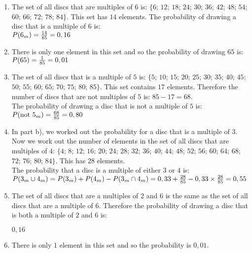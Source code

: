 \begin{solutions}{}
{\begin{enumerate}[itemsep=5pt, label=\textbf{\arabic*}. ]
\begin{enumerate}[noitemsep, label=\textbf{(\alph*)} ]
    \item The set of all discs that are multiples of $6$ is: $\{6$; $ 12$; $ 18$; $ 24$; $ 30$; $ 36$; $ 42$; $ 48$; $ 54$; $ 60$; $ 66$; $ 72$; $ 78$; $ 84\}$. This set has $14$ elements.
    The probability of drawing a disc that is a multiple of $6$ is:\\
    $P(6_m) = \frac{14}{85}\\
	    = 0,16$

    \item There is only one element in this set and so the probability of drawing $65$ is:\\
    $P(65) = \frac{1}{85}\\
	   = 0,01$

    \item The set of all discs that is a multiple of $5$ is: $\{5$; $ 10$; $ 15$; $ 20$; $ 25$; $ 30$; $ 35$; $ 40$; $ 45$; $ 50$; $ 55$; $ 60$; $ 65$; $ 70$; $ 75$; $ 80$; $ 85\}$. This set contains $17$ elements. Therefore the number of discs that are not multiples of $5$ is: $85 − 17 = 68$.\\
   
    The probability of drawing a disc that is not a multiple of $5$ is:\\
    $P(\mbox{not }5_m) = \frac{68}{85}\\
	       = 0,80$

    \item In part b), we worked out the probability for a disc that is a multiple of $3$. Now we work out the number of elements in the set of all discs that are multiples of $4$: $\{4$; $ 8$; $ 12$; $ 16$; $ 20$; $ 24$; $ 28$; $ 32$; $ 36$; $ 40$; $ 44$; $ 48$; $ 52$; $ 56$; $ 60$; $ 64$; $ 68$; $ 72$; $ 76$; $ 80$; $ 84\}$. This has $28$ elements.\\
    
    The probability that a disc is a multiple of either $3$ or $4$ is:\\
    $P(3_m \cup 4_m) = P(3_m) + P(4_m) - P(3_m \cap 4_m)\\
    = 0,33 + \frac{28}{85} - 0,33 \times \frac{28}{85}\\
    = 0,55$
    
    \item The set of all discs that are a multiples of $2$ and $6$ is the same as the set of all discs that are a multiple of $6$. Therefore the probability of drawing a disc that is both a multiple of $2$ and $6$ is:
 
    $0,16$
    
    \item There is only $1$ element in this set and so the probability is $0,01$.
    \end{enumerate}

\end{enumerate}}
\end{solutions}


